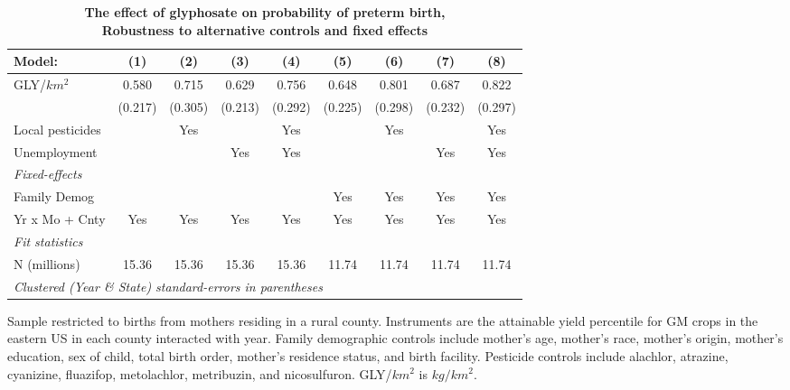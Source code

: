 \begin{table}[htbp]
   \centering
   \small
   \begin{threeparttable}[b]
      \caption{\label{tab:robust-cntrl-i_preterm-e100myielddiffpercentilegmo} \textbf{The effect of glyphosate on probability of preterm birth, \\ Robustness to alternative controls and fixed effects}}
      \begin{tabular}{lcccccccc}
         \toprule
         Model:           & (1)     & (2)     & (3)     & (4)     & (5)     & (6)     & (7)     & (8)\\  
         \midrule 
         GLY/$km^2$       & 0.580   & 0.715   & 0.629   & 0.756   & 0.648   & 0.801   & 0.687   & 0.822\\   
                          & (0.217) & (0.305) & (0.213) & (0.292) & (0.225) & (0.298) & (0.232) & (0.297)\\   
         Local pesticides &         & Yes     &         & Yes     &         & Yes     &         & Yes\\  
         Unemployment     &         &         & Yes     & Yes     &         &         & Yes     & Yes\\  
         \midrule
         \emph{Fixed-effects}\\
         Family Demog     &         &         &         &         & Yes     & Yes     & Yes     & Yes\\  
         Yr x Mo + Cnty   & Yes     & Yes     & Yes     & Yes     & Yes     & Yes     & Yes     & Yes\\  
         \midrule
         \emph{Fit statistics}\\
         N (millions)     & 15.36   & 15.36   & 15.36   & 15.36   & 11.74   & 11.74   & 11.74   & 11.74\\  
         \midrule
         \multicolumn{9}{l}{\emph{Clustered (Year \& State) standard-errors in parentheses}}\\
      \end{tabular}
      
      \begin{tablenotes}\item Sample restricted to births from mothers residing in a rural county. Instruments are the attainable yield percentile for GM crops in the eastern US in each county interacted with year. Family demographic controls include mother's age, mother's race, mother's origin, mother's education, sex of child, total birth order, mother's residence status, and birth facility. Pesticide controls include alachlor, atrazine, cyanizine, fluazifop, metolachlor, metribuzin, and nicosulfuron. GLY/$km^2$ is $kg/km^2$.
      \end{tablenotes}
   \end{threeparttable}
\end{table}
